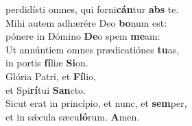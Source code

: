 \evenverse perdidísti omnes, qui forni\textbf{cán}tur \textbf{abs} te.\\
\oddverse Mihi autem adhærére Deo \textbf{bo}num est:~\*\\
\oddverse pónere in Dómino \textbf{De}o spem \textbf{me}am:\\
\evenverse Ut annúntiem omnes prædicatiónes \textbf{tu}as,~\*\\
\evenverse in portis \textbf{fí}liæ \textbf{Si}on.\\
\oddverse Glória Patri, et \textbf{Fí}lio,~\*\\
\oddverse et Spi\textbf{rí}tui \textbf{San}cto.\\
\evenverse Sicut erat in princípio, et nunc, et \textbf{sem}per,~\*\\
\evenverse et in sǽcula sæcu\textbf{ló}rum. \textbf{A}men.\\
